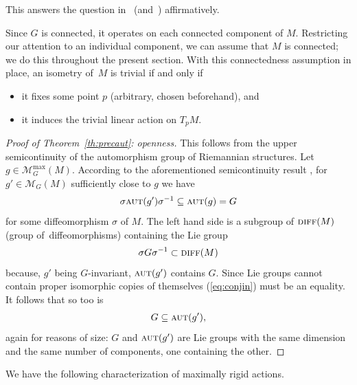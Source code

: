 \documentclass[pdftex]{sigma}%
\numberwithin{equation}{section}
\newcommand{\cat}[1]{\textsc{#1}}
\begin{document}
This answers the question in~\cite[Section~4]{mell} (and~\cite[Question~Q4]{niem}) affirmatively.

\begin{Remark}\label{re:conn}
Since $G$ is connected, it operates on each connected component of $M$. Restricting our attention to an individual component, we can assume that $M$ is connected; we do this throughout the present section. With this connectedness assumption in place, an isometry of~$M$ is trivial if and only if
\begin{itemize}\itemsep=0pt
\item it fixes some point $p$ (arbitrary, chosen beforehand), and
\item it induces the trivial linear action on $T_pM$.
\end{itemize}
\end{Remark}

\begin{proof}[Proof of Theorem~\ref{th:precaut}: openness]
 This follows from the upper semicontinuity of the automorphism group of Riemannian structures. Let $g\in \mathcal{M}_G^{\max}(M)$. According to the aforementioned semicontinuity result \cite[Theorem~8.1]{eb}, for $g'\in \mathcal{M}_G(M)$ sufficiently close to $g$ we have
 \begin{gather}\label{eq:conjin}
 \sigma \cat{aut}(g') \sigma^{-1}\subseteq \cat{aut}(g) = G
 \end{gather}
 for some diffeomorphism $\sigma$ of $M$. The left hand side is a subgroup of $\cat{diff}(M)$ (group of~dif\-feomorphisms) containing the Lie group
 \begin{gather*}
 \sigma G\sigma^{-1} \subset \cat{diff}(M)
 \end{gather*}
 because, $g'$ being $G$-invariant, $\cat{aut}(g')$ contains $G$. Since Lie groups cannot contain proper isomorphic copies of themselves (\ref{eq:conjin}) must be an equality. It follows that so too is
 \begin{gather*}
 G\subseteq \cat{aut}(g'),
 \end{gather*}
 again for reasons of size: $G$ and $\cat{aut}(g')$ are Lie groups with the same dimension and the same number of components, one containing the other.
\end{proof}

We have the following characterization of maximally rigid actions.
\end{document}
